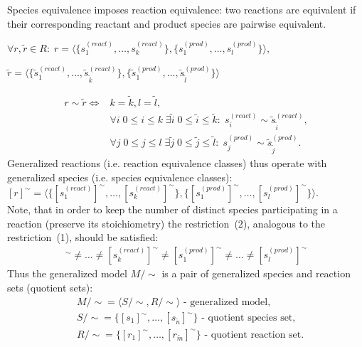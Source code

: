 \documentclass[10pt]{bmc_article}
\newenvironment{bmcformat}{\baselineskip20pt\sloppy\setboolean{publ}{false}}{\baselineskip20pt\sloppy}
\begin{document}
\begin{bmcformat}
Species equivalence imposes reaction equivalence: two reactions are equivalent if their corresponding reactant and product species are pairwise equivalent.
\begin{center}
$\forall r, \tilde{r} \in R:\; r = \langle\{s^{(react)}_1, \ldots, s^{(react)}_k\},\{s^{(prod)}_1, \ldots, s^{(prod)}_l\}\rangle,$
\end{center}
\begin{center}
$\tilde{r} = \langle\{\tilde{s}^{(react)}_1, \ldots, \tilde{s}^{(react)}_{\tilde{k}}\},\{\tilde{s}^{(prod)}_1, \ldots, \tilde{s}^{(prod)}_{\tilde{l}}\}\rangle$
\end{center}
\begin{align*} 
r \sim \tilde{r} \iff & k = \tilde{k}, l = \tilde{l}, \\
& \forall i\; 0\leq{i}\leq{k} \; \exists \tilde{i}\; 0\leq \tilde{i}\leq \tilde{k}:\; s^{(react)}_i \sim \tilde{s}^{(react)}_{\tilde{i}},\\
& \forall j\;0\leq j\leq l\;\exists \tilde{j}\;0\leq \tilde{j}\leq\tilde{l}:\;s^{(prod)}_j \sim \tilde{s}^{(prod)}_{\tilde{j}}.
\end{align*}
Generalized reactions (i.e. reaction equivalence classes) thus operate with generalized species (i.e. species equivalence classes): 
$[r]^{\sim} = \langle\{[s^{(react)}_1]^{\sim}, \ldots, [s^{(react)}_k]^{\sim}\}, \{[s^{(prod)}_1]^{\sim}, \ldots, [s^{(prod)}_l]^{\sim}\}\rangle$.\\
Note, that in order to keep the number of distinct species participating in a reaction (preserve its stoichiometry) the restriction~(2), analogous to the restriction~(1), should be satisfied:
\begin{align}
[s^{(react)}_1]^{\sim} \neq \ldots \neq [s^{(react)}_k]^{\sim} \neq [s^{(prod)}_1]^{\sim} \neq \ldots \neq [s^{(prod)}_l]^{\sim}
\end{align}
Thus the generalized model $M/\sim$ is a pair of generalized species and reaction sets (quotient sets):
\begin{align*} 
&M/\sim = \langle S/\sim, R/\sim \rangle\text{ - generalized model},\\
&S/\sim = \{[s_1]^{\sim}, \ldots, [s_{\tilde{n}}]^{\sim}\}\text{ - quotient species set},\\
&R/\sim = \{[r_1]^{\sim}, \ldots, [r_{\tilde{m}}]^{\sim}\}\text{ - quotient reaction set}.
\end{align*}


\end{bmcformat}
\end{document}

